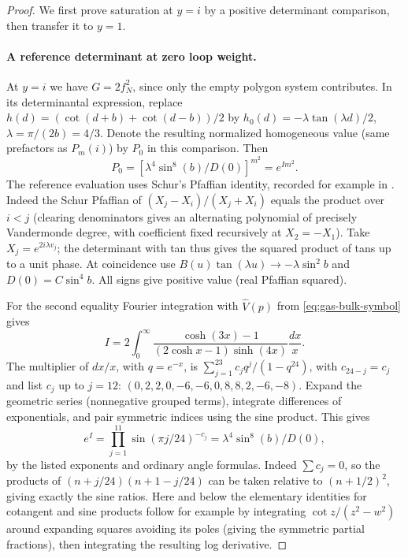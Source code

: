\begin{proof}
We first prove saturation at \(y=i\) by a positive determinant comparison,
then transfer it to \(y=1\).
\paragraph{A reference determinant at zero loop weight.}

At \(y=i\) we have \(G=2f_N^2\), since only the empty polygon system contributes. In its determinantal expression, replace \(h(d)=(\cot(d+b)+\cot(d-b))/2\) by \(h_0(d)=-\lambda\tan(\lambda d)/2\), \(\lambda=\pi/(2b)=4/3\). Denote the resulting normalized homogeneous value (same prefactors as \(P_m(i)\)) by \(P_0\) in this comparison. Then
\[
 P_0=\left[\lambda^4\sin^8(b)/D(0)\right]^{m^2}=e^{I m^2}.
\]
The reference evaluation uses Schur's Pfaffian identity, recorded for example in \cite[Equation~(1.2)]{IshikawaOkadaTagawaZeng2006}. Indeed the Schur Pfaffian of \((X_j-X_i)/(X_j+X_i)\) equals the product over \(i<j\) (clearing denominators gives an alternating polynomial of precisely Vandermonde degree, with coefficient fixed recursively at \(X_2=-X_1\)). Take \(X_j=e^{2i\lambda v_j}\); the determinant with tan thus gives the squared product of tans up to a unit phase. At coincidence use \(B(u)\tan(\lambda u)\to-\lambda\sin^2 b\) and \(D(0)=C\sin^4 b\). All signs give positive value (real Pfaffian squared).

For the second equality Fourier integration with
\(\widehat V(p)\) from \eqref{eq:gas-bulk-symbol} gives
\[
 I=2\int_0^\infty \frac{\cosh(3x)-1}{(2\cosh x-1)\sinh(4x)}\frac{dx}{x}.
\]
The multiplier of \(dx/x\), with \(q=e^{-x}\), is \(\sum_{j=1}^{23}c_j q^j/(1-q^{24})\), with \(c_{24-j}=c_j\) and list \(c_j\) up to \(j=12\):
\((0,2,2,0,-6,-6,0,8,8,2,-6,-8)\).
Expand the geometric series (nonnegative grouped terms), integrate differences of exponentials, and pair symmetric indices using the sine product. This gives
\[
 e^I=\prod_{j=1}^{11}\sin(\pi j/24)^{-c_j}=\lambda^4\sin^8(b)/D(0),
\]
by the listed exponents and ordinary angle formulas. Indeed \(\sum c_j=0\), so the products of \((n+j/24)(n+1-j/24)\) can be taken relative to \((n+1/2)^2\), giving exactly the sine ratios. Here and below the elementary identities for cotangent and sine products follow for example by integrating \(\cot z/(z^2-w^2)\) around expanding squares avoiding its poles (giving the symmetric partial fractions), then integrating the resulting log derivative.


\end{proof}
